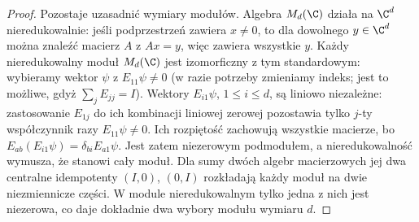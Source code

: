 \begin{proof}
Pozostaje uzasadnić wymiary modułów. Algebra
$M_d(\C)$ działa na $\C^d$ nieredukowalnie:
jeśli podprzestrzeń zawiera $x\ne0$, to
dla dowolnego $y\in\C^d$ można znaleźć
macierz $A$ z $Ax=y$, więc zawiera wszystkie $y$.
Każdy nieredukowalny moduł $M_d(\C)$ jest
izomorficzny z tym standardowym: wybieramy
wektor $\psi$ z $E_{11}\psi\ne0$ (w razie potrzeby
zmieniamy indeks; jest to możliwe, gdyż
$\sum_jE_{jj}=I$). Wektory
$E_{i1}\psi$, $1\leq i\leq d$, są liniowo
niezależne: zastosowanie $E_{1j}$ do ich
kombinacji liniowej zerowej pozostawia
tylko $j$-ty współczynnik razy
$E_{11}\psi\ne0$. Ich rozpiętość zachowują
wszystkie macierze, bo
$E_{ab}(E_{i1}\psi)=\delta_{bi}E_{a1}\psi$.
Jest zatem niezerowym podmodułem, a
nieredukowalność wymusza, że stanowi cały moduł.
Dla sumy dwóch algebr macierzowych jej
dwa centralne idempotenty $(I,0)$, $(0,I)$
rozkładają każdy moduł na dwie niezmiennicze
części. W module nieredukowalnym tylko jedna
z nich jest niezerowa, co daje dokładnie
dwa wybory modułu wymiaru $d$.
\end{proof}

